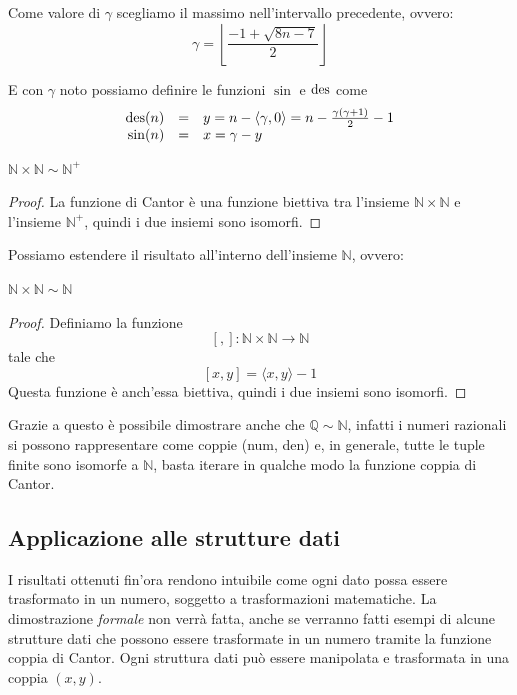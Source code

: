 Come valore di $\gamma$ scegliamo il massimo nell'intervallo precedente, ovvero:
$$ \gamma = \left\lfloor \frac{-1 + \sqrt{8n - 7}}{2} \right\rfloor $$

E con $\gamma$ noto possiamo definire le funzioni $\sin$ e $\operatorname{des}$ come
$$ 
\begin{array}{r c l}
	\operatorname{des}(n) & = & y = n - \langle \gamma, 0 \rangle = n - \frac{\gamma (\gamma + 1)}{2} - 1 \\
	\sin (n) & = & x = \gamma - y
\end{array}
$$

\begin{theor}
	$\mathbb{N} \times \mathbb{N} \sim \mathbb{N}^+$
\end{theor}
\begin{proof}
	La funzione di Cantor è una funzione biettiva tra l'insieme $\mathbb{N} \times \mathbb{N}$ e l'insieme $\mathbb{N}^+$, quindi i due insiemi sono isomorfi.
\end{proof}

Possiamo estendere il risultato all'interno dell'insieme $\mathbb{N}$, ovvero: \\

\begin{theor}
	$\mathbb{N} \times \mathbb{N} \sim \mathbb{N}$
\end{theor}
\begin{proof}
	Definiamo la funzione 
	$$ [,]: \mathbb{N} \times \mathbb{N} \rightarrow \mathbb{N} $$
	tale che
	$$ [x,y] = \langle x,y \rangle - 1$$
	Questa funzione è anch'essa biettiva, quindi i due insiemi sono isomorfi.
\end{proof}

Grazie a questo è possibile dimostrare anche che $\mathbb{Q} \sim \mathbb{N}$, infatti i numeri razionali si possono rappresentare come coppie (num, den) e, in generale, tutte le tuple finite sono isomorfe a $\mathbb{N}$, basta iterare in qualche modo la funzione coppia di Cantor.

\subsection{Applicazione alle strutture dati}

I risultati ottenuti fin'ora rendono intuibile come ogni dato possa essere trasformato in un numero, soggetto a trasformazioni matematiche. La dimostrazione \textit{formale} non verrà fatta, anche se verranno fatti esempi di alcune strutture dati che possono essere trasformate in un numero tramite la funzione coppia di Cantor. Ogni struttura dati può essere manipolata e trasformata in una coppia $(x,y)$.

